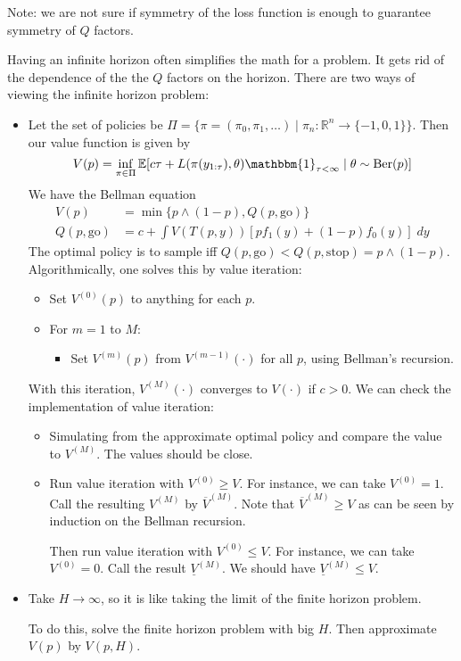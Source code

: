 \documentclass[pdftex,letterpaper,11pt]{article}
\theoremstyle{definition}
\theoremstyle{definition}
\theoremstyle{definition}
\newcommand{\ind}{\mathbbm{1}}
\newcommand{\RR}{\mathbb R}
\newcommand{\EE}{\mathbb E}
\newcommand{\mrm}[1]{\mathrm{#1}}
\newcommand{\ol}[1]{\overline{#1}}
\newcommand{\ul}[1]{\underline{#1}}
\begin{document}
Note: we are not sure if symmetry of the loss function is enough to guarantee symmetry of $Q$ factors.

Having an infinite horizon often simplifies the math for a problem. It gets rid of the dependence of the the $Q$ factors on the horizon. There are two ways of viewing the infinite horizon problem:
\begin{itemize}
	\item Let the set of policies be $\Pi = \{\pi = (\pi_0, \pi_1, \ldots ) \mid \pi_n: \RR^n \to \{-1, 0, 1\} \}$. Then our value function is given by
		\[V(p) = \inf_{\pi \in \Pi} \EE[c\tau + L(\pi(y_{1:\tau}), \theta) \ind_{\tau < \infty} \mid \theta \sim \mrm{Ber}(p)] \]
		We have the Bellman equation
		\begin{align*}
			V(p) & = \min\{p \wedge (1-p), Q(p, \mrm{go})\}\\
			Q(p, \mrm{go}) & = c + \int V(T(p,y)) [p f_1(y) + (1-p)f_0(y)] \; dy
		\end{align*}
		The optimal policy is to sample iff $Q(p, \mrm{go}) < Q(p, \mrm{stop}) = p\wedge (1-p)$. Algorithmically, one solves this by value iteration:
		\begin{itemize}
			\item[] Set $V^{(0)}(p)$ to anything for each $p$.
			\item[] For $m=1$ to $M$:
				\begin{itemize}
					\item[] Set $V^{(m)}(p)$ from $V^{(m-1)}(\cdot)$ for all $p$, using Bellman's recursion.
				\end{itemize}
		\end{itemize}
		With this iteration, $V^{(M)}(\cdot)$ converges to $V(\cdot)$ if $c > 0$. We can check the implementation of value iteration:
		\begin{itemize}
			\item Simulating from the approximate optimal policy and compare the value to $V^{(M)}$. The values should be close.
			\item Run value iteration with $V^{(0)} \geq V$. For instance, we can take $V^{(0)} = 1$. Call the resulting $V^{(M)}$ by $\ol V^{(M)}$. Note that $\ol V^{(M)} \geq V$ as can be seen by induction on the Bellman recursion.

				Then run value iteration with $V^{(0)} \leq V$. For instance, we can take $V^{(0)} = 0$. Call the result $\ul{V}^{(M)}$. We should have $\ul{V}^{(M)} \leq V$.
		\end{itemize}

	\item Take $H\to \infty$, so it is like taking the limit of the finite horizon problem.

		To do this, solve the finite horizon problem with big $H$. Then approximate $V(p)$ by $V(p, H)$.
\end{itemize}
\end{document}
